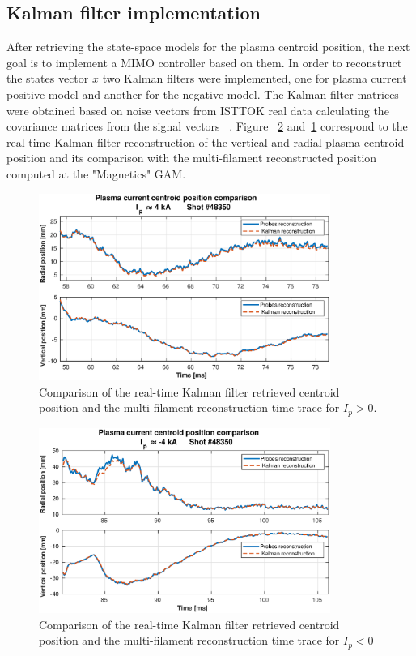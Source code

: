\subsection{Kalman filter implementation}

After retrieving the state-space models for the plasma centroid position, the next goal is to implement a MIMO controller based on them. In order to reconstruct the states vector $x$ two Kalman filters were implemented, one for plasma current positive model and another for the negative model. The Kalman filter matrices were obtained  based on noise vectors from ISTTOK real data calculating  the covariance matrices from the signal vectors ~\cite{Mele2018}.  Figure ~\ref{Kalman_neg} and~\ref{Kalman_pos} correspond to the real-time Kalman filter reconstruction of the vertical and radial plasma centroid position and its comparison with the multi-filament reconstructed  position computed at the "Magnetics" GAM.\smallskip

\begin{figure}[h]
	\centering
	\includegraphics[width=0.85\textwidth]{Chp5/Kalman_comp_pos.eps}
	\caption{ Comparison of the real-time Kalman filter retrieved centroid position and the multi-filament reconstruction time trace for $I_p>0$.\label{Kalman_pos}}
\end{figure}

\begin{figure}[h]
	\centering
	\includegraphics[width=0.85\textwidth]{Chp5/Kalman_comp_neg.eps}
	\caption{ Comparison of the real-time Kalman filter retrieved centroid position and the multi-filament reconstruction time trace for $I_p<0$\label{Kalman_neg}}
\end{figure}

